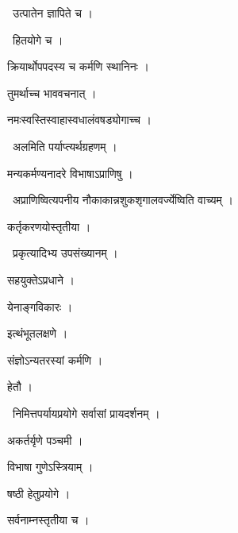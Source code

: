 \documentclass[10pt, openany, oneside]{book}
\begin{document}
\par\noindent\hspace{1.5em}{\vps वा॰}~{\qt उत्पातेन ज्ञापिते च ।}

\par\noindent\hspace{1.5em}{\vps वा॰}~{\qt हितयोगे च ।}

\noindent क्रियार्थोपपदस्य च कर्मणि स्थानिनः ।

\noindent तुमर्थाच्च भाववचनात् ।

\noindent नमःस्वस्तिस्वाहास्वधालंवषड्योगाच्च ।

\par\noindent\hspace{1.5em}{\vps वा॰}~{\qt अलमिति पर्याप्त्यर्थग्रहणम् ।}

\noindent मन्यकर्मण्यनादरे विभाषाऽप्राणिषु ।

\par\noindent\hspace{1.5em}{\vps वा॰}~{\qt अप्राणिष्वित्यपनीय नौकाकान्नशुकशृगालवर्ज्येष्विति वाच्यम् ।}

\noindent कर्तृकरणयोस्तृतीया ।

\par\noindent\hspace{1.5em}{\vps वा॰}~{\qt प्रकृत्यादिभ्य उपसंख्यानम् ।}

\noindent सहयुक्तेऽप्रधाने ।

\noindent येनाङ्गविकारः ।

\noindent इत्थंभूतलक्षणे ।

\noindent संज्ञोऽन्यतरस्यां कर्मणि ।

\noindent हेतौ ।

\par\noindent\hspace{1.5em}{\vps वा॰}~{\qt निमित्तपर्यायप्रयोगे सर्वासां प्रायदर्शनम् ।}

\noindent अकर्तर्यृणे पञ्चमी ।

\noindent विभाषा गुणेऽस्त्रियाम् ।

\noindent षष्ठी हेतुप्रयोगे ।

\noindent सर्वनाम्नस्तृतीया च ।
\end{document}
